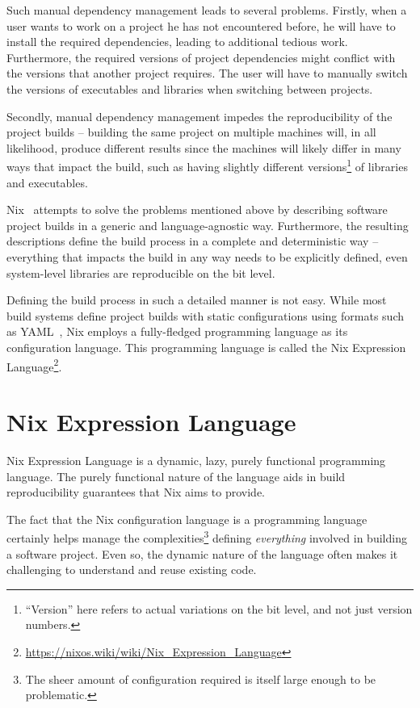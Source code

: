 \documentclass[a4paper,conference]{IEEEtran}
\begin{document}
Such manual dependency management leads to several problems. Firstly, when a user wants to work on a project he has not encountered before, he will have to install the required dependencies, leading to additional tedious work. Furthermore, the required versions of project dependencies might conflict with the versions that another project requires. The user will have to manually switch the versions of executables and libraries when switching between projects.

Secondly, manual dependency management impedes the reproducibility of the project builds -- building the same project on multiple machines will, in all likelihood, produce different results since the machines will likely differ in many ways that impact the build, such as having slightly different versions\footnote{``Version'' here refers to actual variations on the bit level, and not just version numbers.} of libraries and executables.

Nix~\cite{dolstra2008nixos} attempts to solve the problems mentioned above by describing software project builds in a generic and language-agnostic way. Furthermore, the resulting descriptions define the build process in a complete and deterministic way -- everything that impacts the build in any way needs to be explicitly defined, even system-level libraries are reproducible on the bit level.

Defining the build process in such a detailed manner is not easy. While most build systems define project builds with static configurations using formats such as YAML~\cite{ben2009yaml}, Nix employs a fully-fledged programming language as its configuration language. This programming language is called the Nix Expression Language\footnote{\url{https://nixos.wiki/wiki/Nix_Expression_Language}}.

\section{Nix Expression Language}

Nix Expression Language is a dynamic, lazy, purely functional programming language. The purely functional nature of the language aids in build reproducibility guarantees that Nix aims to provide.

The fact that the Nix configuration language is a programming language certainly helps manage the complexities\footnote{The sheer amount of configuration required is itself large enough to be problematic.} defining \emph{everything} involved in building a software project. Even so, the dynamic nature of the language often makes it challenging to understand and reuse existing code.
\end{document}

